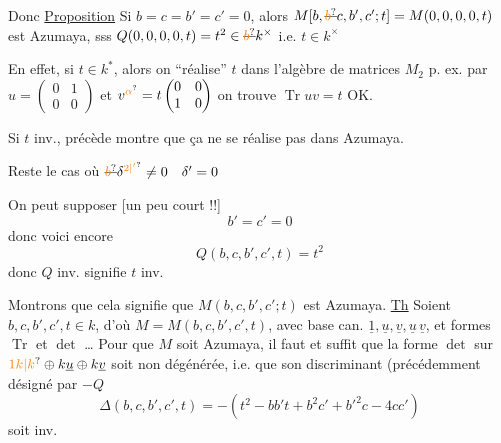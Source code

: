 Donc
\uline{Proposition} Si $b=c=b'=c'=0$, alors $M[b,\deleted{\unsure{b}}c,b',c';t]=M(0,0,0,0,t)$ est Azumaya, sss  $Q(0,0,0,0,t)=t^2\in\deleted{\unsure{b}}k^\times$ i.e. $t\in k^\times$

En effet, si $t\in k^*$, alors on ``réalise'' $t$ dans l'algèbre de matrices $M_2$ p. ex. par $u=\begin{pmatrix}0&1\\0&0\end{pmatrix}$ et $v^{\unsure{\alpha}}=t\begin{pmatrix}0&0\\1&0\end{pmatrix}$ on trouve $\operatorname{Tr}uv=t$ OK.

Si $t$  inv.,   précède montre que ça ne se réalise pas dans Azumaya.


Reste le cas où $\deleted{\unsure{b}}\delta^{\unsure{2|'}}\ne0\quad\delta'=0$

 On peut supposer [un peu court !!]
\[
b'=c'=0
\]
donc voici encore
\[
Q(b,c,b',c',t)=t^2
\]
donc $Q$ inv. signifie $t$ inv.

Montrons que cela signifie que $M(b,c,b',c';t)$ est Azumaya.
\uline{Th} Soient $b,c,b',c',t\in k$, d'où $M=M(b,c,b',c',t)$, avec base can. $\underline{1},\underline{u},\underline{v},\underline{u}\,\underline{v}$, et formes $\operatorname{Tr}$ et $\det$ \ldots{} Pour que $M$ soit Azumaya, il faut et suffit que la forme $\det$ sur $\unsure{1k|k}\oplus k\underline{u}\oplus k\underline{v}$ soit non dégénérée, i.e. que son discriminant   (précédemment désigné par $-Q$
\[
\Delta(b,c,b',c',t)=-(t^2-bb't+b^2c'+b'^2c-4cc')
\]
soit inv.

